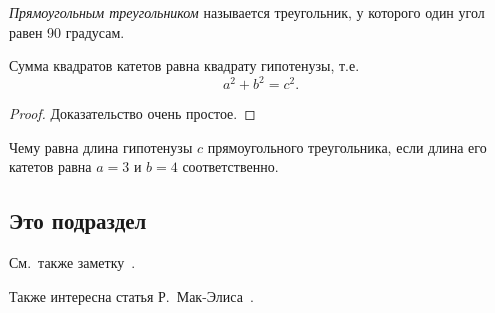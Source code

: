 \documentclass[example-notes.tex]{subfiles}
\begin{document}

    \begin{definition}
        \label{def:202211081146}
        \emph{Прямоугольным треугольником} называется треугольник, у которого один угол равен 90 градусам.
    \end{definition}

    \begin{theorem}
        \label{thm:202211081146}
        Сумма квадратов катетов равна квадрату гипотенузы, т.е.
        \begin{equation}
            \label{eq:202211081146:piphagor}
            a^2+b^2=c^2.
        \end{equation}
    \end{theorem}
    \begin{proof}
        Доказательство очень простое.
    \end{proof}

    \begin{exercise}
        \label{exer:202211081146:1}
        Чему равна длина гипотенузы $c$ прямоугольного треугольника, если длина его катетов равна $a=3$ и $b=4$ соответственно.
    \end{exercise}

    \subsection{Это подраздел}\label{subsec:202211081146:this}

    \Blindtext

    \seealso
    См.~также заметку~.

    Также интересна статья Р.~Мак-Элиса~\cite{j.mceliece1978}.
\end{document}
